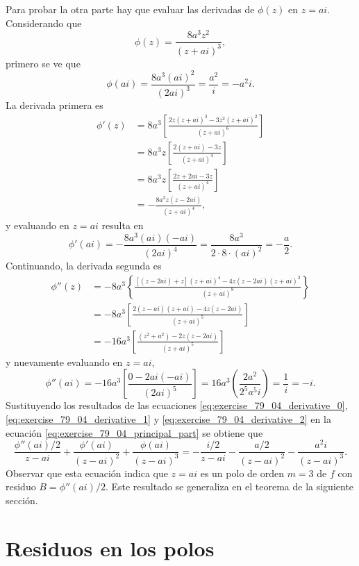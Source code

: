 \documentclass[a4paper]{report}
\begin{document}
Para probar la otra parte hay que evaluar las derivadas de \(\phi(z)\) en \(z=ai\). Considerando que 
\[
 \phi(z)=\frac{8a^3z^2}{(z+ai)^3},
\]
primero se ve que 
\begin{equation}\label{eq:exercise_79_04_derivative_0}
 \phi(ai)=\frac{8a^3(ai)^2}{(2ai)^3}=\frac{a^2}{i}=-a^2i. 
\end{equation}
La derivada primera es
\begin{align*}
 \phi'(z)&=8a^3\left[\frac{2z(z+ai)^3-3z^2(z+ai)^2}{(z+ai)^6}\right]\\
 &=8a^3z\left[\frac{2(z+ai)-3z}{(z+ai)^4}\right]\\
 &=8a^3z\left[\frac{2z+2ai-3z}{(z+ai)^4}\right]\\
 &=-\frac{8a^3z(z-2ai)}{(z+ai)^4},
\end{align*}
y evaluando en \(z=ai\) resulta en
\begin{equation}\label{eq:exercise_79_04_derivative_1}
 \phi'(ai)=-\frac{8a^3(ai)(-ai)}{(2ai)^4}=\frac{8a^3}{2\cdot8\cdot(ai)^2}=-\frac{a}{2}. 
\end{equation}
Continuando, la derivada segunda es
\begin{align*}
 \phi''(z)&=-8a^3\left\{\frac{[(z-2ai)+z](z+ai)^4-4z(z-2ai)(z+ai)^3}{(z+ai)^8}\right\}\\ 
   &=-8a^3\left[\frac{2(z-ai)(z+ai)-4z(z-2ai)}{(z+ai)^5}\right]\\ 
   &=-16a^3\left[\frac{(z^2+a^2)-2z(z-2ai)}{(z+ai)^5}\right]
\end{align*}
y nuevamente evaluando en \(z=ai\),
\begin{equation}\label{eq:exercise_79_04_derivative_2}
 \phi''(ai)=-16a^3\left[\frac{0-2ai(-ai)}{(2ai)^5}\right]=16a^3\left(\frac{2a^2}{2^5a^5i}\right)=\frac{1}{i}=-i. 
\end{equation}
Sustituyendo los resultados de las ecuaciones \ref{eq:exercise_79_04_derivative_0}, \ref{eq:exercise_79_04_derivative_1} y \ref{eq:exercise_79_04_derivative_2} en la ecuación \ref{eq:exercise_79_04_principal_part} se obtiene que  
\[
 \frac{\phi''(ai)/2}{z-ai}+\frac{\phi'(ai)}{(z-ai)^2}+\frac{\phi(ai)}{(z-ai)^3}=
 -\frac{i/2}{z-ai}-\frac{a/2}{(z-ai)^2}-\frac{a^2i}{(z-ai)^3}.
\]
Observar que esta ecuación indica que \(z=ai\) es un polo de orden \(m=3\) de \(f\) con residuo \(B=\phi''(ai)/2\). Este resultado se generaliza en el teorema de la siguiente sección.

\section{Residuos en los polos}\label{sec:residues_at_poles}
\end{document}
